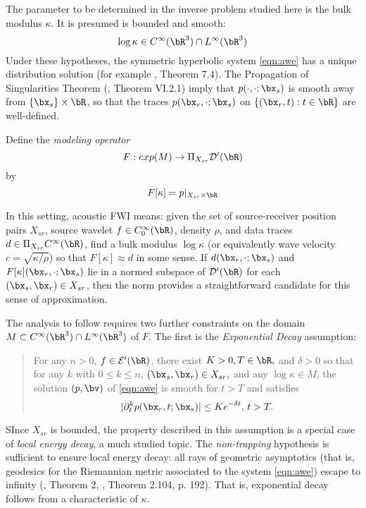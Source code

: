 The parameter to be determined in the inverse problem studied here is
the bulk modulus $\kappa$. It is presumed is bounded and smooth:
\begin{equation}
  \label{eqn:coeff}
  \log \kappa \in C^{\infty}(\bR^3) \cap L^{\infty}(\bR^3)
\end{equation}
Under these hypotheses, the symmetric hyperbolic system \ref{eqn:awe}
has a unique distribution solution (for example \cite{Lax:PDENotes},
Theorem 7.4). The Propagation of
Singularities Theorem (\cite{Tay:81}, Theorem VI.2.1) %
imply that $p(\cdot,\cdot;\bx_s)$ is smooth away from $\{\bx_s\}
\times \bR$, so that the traces $p(\bx_r, \cdot;\bx_s)$ on
$\{(\bx_r,t): t \in \bR\}$ are well-defined.

Define the {\em modeling operator}
\begin{equation}
  \label{eqn:modop}
  F: exp(M)  \rightarrow \Pi_{X_{sr}} {\cal D}'(\bR)
\end{equation}
by
\begin{equation}
  \label{eqn:modopdef}
  F[\kappa]= p|_{X_{sr} \times \bR}
\end{equation}

In this setting, acoustic FWI means: given the set of
source-receiver position pairs $X_{sr}$, source wavelet
$f \in C_0^{\infty}(\bR)$,  density $\rho$, and data traces
$d \in \Pi_{X_{sr}} C^{\infty}(\bR)$, find a bulk modulus $\log
\kappa$
(or equivalently wave velocity $c=\sqrt{\kappa/\rho}$)
so that $F[\kappa] \approx d$ in some sense. If
$d(\bx_r,\cdot;\bx_s)$ and $F[\kappa](\bx_r,\cdot;\bx_s)$ lie in a normed subspace of ${\cal D}'(\bR)$ for each
$(\bx_s,\bx_r) \in X_{sr}$, then the
norm provides a straightforward candidate for this sense of
approximation.

The analysis to follow requires two further constraints on the domain
$M \subset C^{\infty}(\bR^3) \cap L^{\infty}(\bR^3)$ of $F$. The first is
the {\em Exponential Decay} assumption:
\begin{quote}
  For any $n > 0$, $f \in {\cal E}'(\bR)$,
  there exist $K >
  0, T \in \bR,$ and $\delta>0$ so
  that for any $k$ with $0 \le k \le n$, $(\bx_s,\bx_r) \in
 X_{sr},$ and any $\log \kappa \in M$, the solution $(p,\bv)$ of \ref{eqn:awe} is smooth
  for $t>T$ and satisfies
  \[
    |\partial_t^k p(\bx_r,t;\bx_s)| \le K e^{-\delta t}, \, t > T.
  \]
\end{quote}
SInce $X_{sr}$ is bounded, the property described in this assumption
is a special case of {\em local energy decay}, a much studied topic. The {\em
  non-trapping} hypothesis is sufficient to ensure local energy decay:
all rays of geometric asymptotics (that is, geodesics for the Riemannian metric associated
to the system \ref{eqn:awe}) escape to infinity (\cite{Hristova:09},
Theorem 2, \cite{EgorovShubin}, Theorem 2.104, p. 192). That is,
exponential decay follows from a characteristic of $\kappa$.

